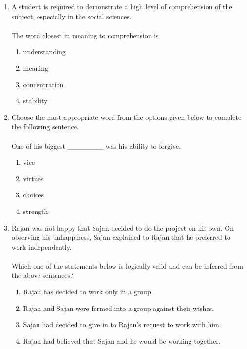 \documentclass[journal]{IEEEtran}
\begin{document}
\begin{enumerate}
    \item A student is required to demonstrate a high level of \underline{comprehension} of the subject, especially in the
    social sciences. \\ \\ The word closest in meaning to \underline{comprehension} is
        \begin{enumerate}
            \item understanding
            \item meaning
            \item concentration
            \item stability
        \end{enumerate}

    \item Choose the most appropriate word from the options given below to complete the following
    sentence. \\ \\ One of his biggest \_\_\_\_\_\_\_ was his ability to forgive.
        \begin{enumerate}
            \item vice
            \item virtues
            \item choices
            \item strength
        \end{enumerate}

    \item Rajan was not happy that Sajan decided to do the project on his own. On observing his unhappiness, Sajan explained to Rajan that he preferred to work independently. \\ \\Which one of the statements below is logically valid and can be inferred from the above sentences?
        \begin{enumerate}
            \item Rajan has decided to work only in a group.
            \item Rajan and Sajan were formed into a group against their wishes.
            \item Sajan had decided to give in to Rajan's request to work with him.
            \item Rajan had believed that Sajan and he would be working together.
        \end{enumerate}
        

\end{enumerate}
\end{document}
